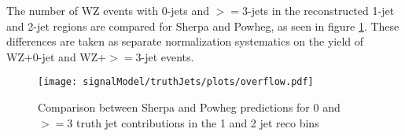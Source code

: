 The number of WZ events with 0-jets and $>=$3-jets in the reconstructed 1-jet and 2-jet regions are compared for Sherpa and Powheg, as seen in figure \ref{fig:overflow}. These differences are taken as separate normalization systematics on the yield of WZ+0-jet and WZ+$>=$3-jet events.

\begin{figure}[H]
    \centering
    \texttt{[image: signalModel/truthJets/plots/overflow.pdf]}
    \caption{Comparison between Sherpa and Powheg predictions for 0 and $>=$3 truth jet contributions in the 1 and 2 jet reco bins}
\label{fig:overflow}
\end{figure} 
